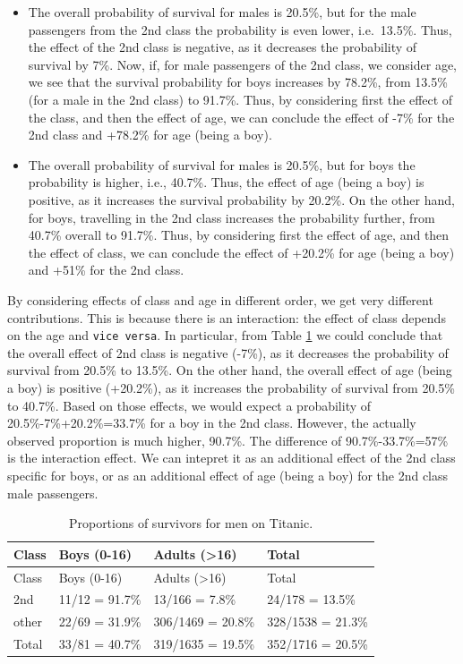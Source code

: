 \documentclass[12pt,]{krantz}
\providecommand{\tightlist}{%
  \setlength{\itemsep}{0pt}\setlength{\parskip}{0pt}}
\begin{document}
\begin{itemize}
\tightlist
\item
  The overall probability of survival for males is 20.5\%, but for the male passengers from the 2nd class the probability is even lower, i.e.~13.5\%. Thus, the effect of the 2nd class is negative, as it decreases the probability of survival by 7\%. Now, if, for male passengers of the 2nd class, we consider age, we see that the survival probability for boys increases by 78.2\%, from 13.5\% (for a male in the 2nd class) to 91.7\%. Thus, by considering first the effect of the class, and then the effect of age, we can conclude the effect of -7\% for the 2nd class and +78.2\% for age (being a boy).
\item
  The overall probability of survival for males is 20.5\%, but for boys the probability is higher, i.e., 40.7\%. Thus, the effect of age (being a boy) is positive, as it increases the survival probability by 20.2\%. On the other hand, for boys, travelling in the 2nd class increases the probability further, from 40.7\% overall to 91.7\%. Thus, by considering first the effect of age, and then the effect of class, we can conclude the effect of +20.2\% for age (being a boy) and +51\% for the 2nd class.
\end{itemize}

By considering effects of class and age in different order, we get very different contributions. This is because there is an interaction: the effect of class depends on the age and \texttt{vice\ versa}. In particular, from Table \ref{tab:titanicMaleSurvival} we could conclude that the overall effect of 2nd class is negative (-7\%), as it decreases the probability of survival from 20.5\% to 13.5\%. On the other hand, the overall effect of age (being a boy) is positive (+20.2\%), as it increases the probability of survival from 20.5\% to 40.7\%. Based on those effects, we would expect a probability of 20.5\%-7\%+20.2\%=33.7\% for a boy in the 2nd class. However, the actually observed proportion is much higher, 90.7\%. The difference of 90.7\%-33.7\%=57\% is the interaction effect. We can intepret it as an additional effect of the 2nd class specific for boys, or as an additional effect of age (being a boy) for the 2nd class male passengers.

\begin{longtable}[]{@{}llll@{}}
\caption{\label{tab:titanicMaleSurvival} Proportions of survivors for men on Titanic.}\tabularnewline
\toprule
Class & Boys (0-16) & Adults (\textgreater{}16) & Total\tabularnewline
\midrule
\endfirsthead
\toprule
Class & Boys (0-16) & Adults (\textgreater{}16) & Total\tabularnewline
\midrule
\endhead
2nd & 11/12 = 91.7\% & 13/166 = 7.8\% & 24/178 = 13.5\%\tabularnewline
other & 22/69 = 31.9\% & 306/1469 = 20.8\% & 328/1538 = 21.3\%\tabularnewline
Total & 33/81 = 40.7\% & 319/1635 = 19.5\% & 352/1716 = 20.5\%\tabularnewline
\bottomrule
\end{longtable}
\end{document}
